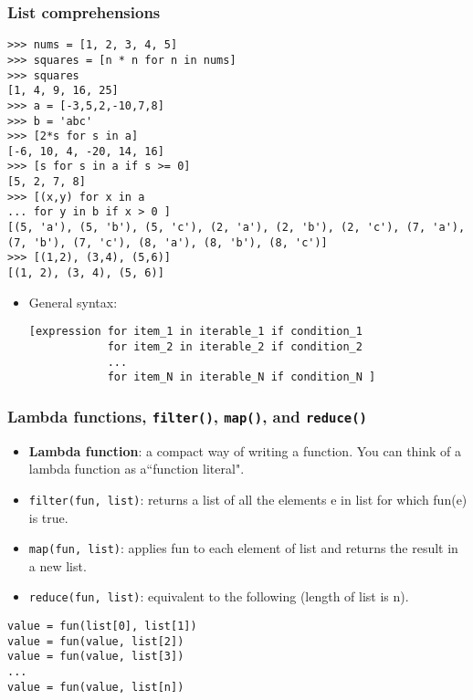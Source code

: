 \documentclass[handout]{beamer}
\numberwithin{equation}{section}
\begin{document}
\begin{frame}[fragile]
\frametitle{List comprehensions}

\begin{lstlisting}[name=ex]
>>> nums = [1, 2, 3, 4, 5]
>>> squares = [n * n for n in nums]
>>> squares
[1, 4, 9, 16, 25]
>>> a = [-3,5,2,-10,7,8]
>>> b = 'abc'
>>> [2*s for s in a]
[-6, 10, 4, -20, 14, 16]
>>> [s for s in a if s >= 0]
[5, 2, 7, 8]
>>> [(x,y) for x in a
... for y in b if x > 0 ]
[(5, 'a'), (5, 'b'), (5, 'c'), (2, 'a'), (2, 'b'), (2, 'c'), (7, 'a'), 
(7, 'b'), (7, 'c'), (8, 'a'), (8, 'b'), (8, 'c')]
>>> [(1,2), (3,4), (5,6)]
[(1, 2), (3, 4), (5, 6)]
\end{lstlisting}

\pause
\begin{itemize}
\item General syntax:

\begin{lstlisting}[name=ex]
[expression for item_1 in iterable_1 if condition_1 
            for item_2 in iterable_2 if condition_2
            ...
            for item_N in iterable_N if condition_N ]
\end{lstlisting}
\end{itemize}
\end{frame}



\begin{frame}[fragile]
\frametitle{Lambda functions, {\tt filter()}, {\tt map()}, and {\tt reduce()}}

\begin{itemize}
\item {\bf Lambda function}: a compact way of writing a function. You can think of a lambda function as a``function literal".
\pause \item {\tt filter(fun, list)}: returns a list of all the elements e in list for which fun(e) is true.
\pause \item {\tt map(fun, list)}: applies fun to each element of list and returns the result in a new list.
\pause \item {\tt reduce(fun, list)}: equivalent to the following (length of list is n).
\end{itemize}

\begin{lstlisting}[name=ex]
value = fun(list[0], list[1])
value = fun(value, list[2])
value = fun(value, list[3])
...
value = fun(value, list[n])
\end{lstlisting}
\end{frame}
\end{document}
